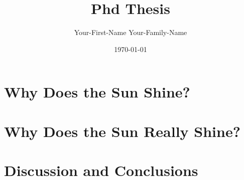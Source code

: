 \documentclass[12pt,oneside]{book}
\title{Phd Thesis}
\author{Your-First-Name Your-Family-Name}
\date{\today}
\begin{document}
\newcommand{\mcgillguidelines}{\href{https://www.mcgill.ca/gps/thesis/thesis-guidelines/preparation}{Official McGill Guidelines: }}


\begin{onehalfspacing}
\pagestyle{empty}

\cleardoublepage
\end{onehalfspacing}


\pagestyle{plain}



\clearpage

\cleardoublepage



\clearpage



\clearpage

\tableofcontents
\listoffigures
\listoftables
\clearpage








\part{Why Does the Sun Shine?}
\label{part:part1}



\part{Why Does the Sun Really Shine?}
\label{part:part2}



\part{Discussion and Conclusions}
\label{part:disclusions}










\end{document}
